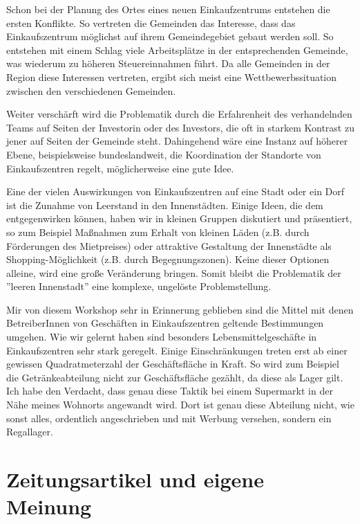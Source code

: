 \documentclass[]{article}
\begin{document}
Schon bei der Planung des Ortes eines neuen Einkaufzentrums entstehen die ersten Konflikte. So vertreten die Gemeinden das Interesse, dass das Einkaufszentrum möglichst auf ihrem Gemeindegebiet gebaut werden soll. So entstehen mit einem Schlag viele Arbeitsplätze in der entsprechenden Gemeinde, was wiederum zu höheren Steuereinnahmen führt. Da alle Gemeinden in der Region diese Interessen vertreten, ergibt sich meist eine Wettbewerbssituation zwischen den verschiedenen Gemeinden.

Weiter verschärft wird die Problematik durch die Erfahrenheit des verhandelnden Teams auf Seiten der Investorin oder des Investors, die oft in starkem Kontrast zu jener auf Seiten der Gemeinde steht. Dahingehend wäre eine Instanz auf höherer Ebene, beispielsweise bundeslandweit, die Koordination der Standorte von Einkaufszentren regelt, möglicherweise eine gute Idee.

Eine der vielen Auswirkungen von Einkaufszentren auf eine Stadt oder ein Dorf ist die Zunahme von Leerstand in den Innenstädten. Einige Ideen, die dem entgegenwirken können, haben wir in kleinen Gruppen diskutiert und präsentiert, so zum Beispiel Maßnahmen zum Erhalt von kleinen Läden (z.B. durch Förderungen des Mietpreises) oder attraktive Gestaltung der Innenstädte als Shopping-Möglichkeit (z.B. durch Begegnungszonen). Keine dieser Optionen alleine, wird eine große Veränderung bringen. Somit bleibt die Problematik der ''leeren Innenstadt'' eine komplexe, ungelöste Problemstellung.

Mir von diesem Workshop sehr in Erinnerung geblieben sind die Mittel mit denen BetreiberInnen von Geschäften in Einkaufszentren geltende Bestimmungen umgehen. Wie wir gelernt haben sind besonders Lebensmittelgeschäfte in Einkaufszentren sehr stark geregelt. Einige Einschränkungen treten erst ab einer gewissen Quadratmeterzahl der Geschäftsfläche in Kraft. So wird zum Beispiel die Getränkeabteilung nicht zur Geschäftsfläche gezählt, da diese als Lager gilt. Ich habe den Verdacht, dass genau diese Taktik bei einem Supermarkt in der Nähe meines Wohnorts angewandt wird. Dort ist genau diese Abteilung nicht, wie sonst alles, ordentlich angeschrieben und mit Werbung versehen, sondern ein Regallager.

\section{Zeitungsartikel und eigene Meinung}
\end{document}
